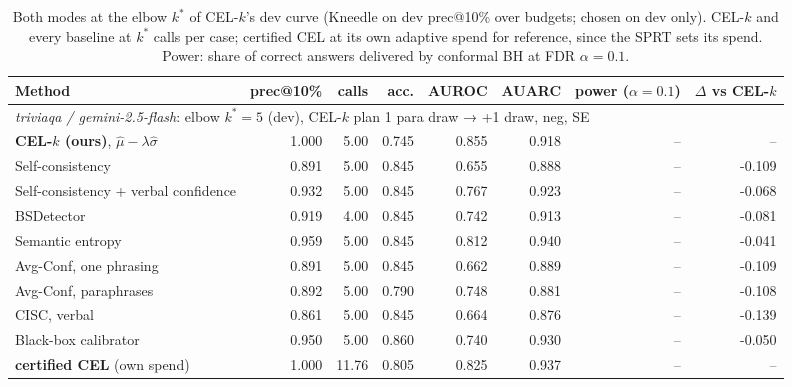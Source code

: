 \begin{table}[t]
\centering
\small
\begin{tabular}{lrrrrrrr}
\toprule
Method & prec@10\% & calls & acc. & AUROC & AUARC & power ($\alpha{=}0.1$) & $\Delta$ vs CEL-$k$ \\
\midrule
\multicolumn{8}{l}{\emph{triviaqa / gemini-2.5-flash}: elbow $k^* = 5$ (dev), CEL-$k$ plan 1 para draw → +1 draw, neg, SE} \\
\textbf{CEL-$k$ (ours)}, $\hat\mu - \lambda\hat\sigma$ & 1.000 & 5.00 & 0.745 & 0.855 & 0.918 & -- & -- \\
Self-consistency & 0.891 & 5.00 & 0.845 & 0.655 & 0.888 & -- & -0.109 \\
Self-consistency + verbal confidence & 0.932 & 5.00 & 0.845 & 0.767 & 0.923 & -- & -0.068 \\
BSDetector \citep{chen2024} & 0.919 & 4.00 & 0.845 & 0.742 & 0.913 & -- & -0.081 \\
Semantic entropy & 0.959 & 5.00 & 0.845 & 0.812 & 0.940 & -- & -0.041 \\
Avg-Conf, one phrasing \citep{xiong2023} & 0.891 & 5.00 & 0.845 & 0.662 & 0.889 & -- & -0.109 \\
Avg-Conf, paraphrases \citep{xiong2023} & 0.892 & 5.00 & 0.790 & 0.748 & 0.881 & -- & -0.108 \\
CISC, verbal \citep{taubenfeld2025} & 0.861 & 5.00 & 0.845 & 0.664 & 0.876 & -- & -0.139 \\
Black-box calibrator \citep{pedapati2024} & 0.950 & 5.00 & 0.860 & 0.740 & 0.930 & -- & -0.050 \\
\textbf{certified CEL} (own spend) & 1.000 & 11.76 & 0.805 & 0.825 & 0.937 & -- & -- \\
\bottomrule
\end{tabular}
\caption{Both modes at the elbow $k^*$ of CEL-$k$'s dev curve (Kneedle on dev prec@10\% over budgets; chosen on dev only). CEL-$k$ and every baseline at $k^*$ calls per case; certified CEL at its own adaptive spend for reference, since the SPRT sets its spend. Power: share of correct answers delivered by conformal BH at FDR $\alpha = 0.1$.}
\label{tab:elbow}
\end{table}
